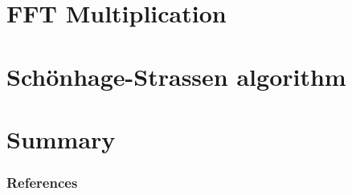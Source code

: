 \documentclass{beamer}
\begin{document}
\section{FFT Multiplication}

\section{Schönhage-Strassen algorithm}

\section{Summary}

\begin{frame}
		\frametitle{References}
		\printbibliography
\end{frame}
\end{document}
